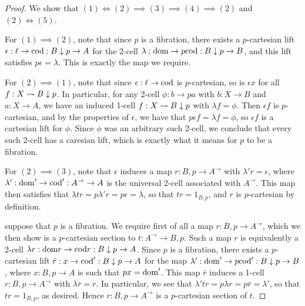 \documentclass[../thesis.tex]{subfiles}
\begin{document}
\begin{proof}
  We show that $(1) \iff (2) \implies (3) \implies (4) \implies (2)$ and $(2) \iff (5)$.

  For $(1) \implies (2)$, note that since $p$ is a fibration, there exists a $p$-cartesian lift $\epsilon : \ell
  \to {\mathrm{cod}} : B \mathrel{\downarrow} p \to A$ for the 2-cell $\lambda : {\mathrm{dom}} \to p{\mathrm{cod}} : B \mathrel{\downarrow} p \to B$, and this lift
  satisfies $p\epsilon = \lambda$. This is exactly the map we require.

  For $(2) \implies (1)$, note that since $\epsilon : \ell \to {\mathrm{cod}}$ is $p$-cartesian, so is $\epsilon x$ for
  all $f : X \rightsquigarrow B \mathrel{\downarrow} p$. In particular, for any 2-cell $\phi : b \to pa$ with $b : X \to B$ and $a : X
  \to A$, we have an induced 1-cell $f : X \rightsquigarrow B \mathrel{\downarrow} p$ with $\lambda f = \phi$. Then $\epsilon f$ is $p$-%
  cartesian, and by the properties of $\epsilon$, we have that $p\epsilon f = \lambda f = \phi$, so $\epsilon f$
  is a cartesian lift for $\phi$. Since $\phi$ was an arbitrary such 2-cell, we conclude that every such 2-cell
  has a caresian lift, which is exactly what it means for $p$ to be a fibration.


  For $(2) \implies (3)$, note that $\epsilon$ induces a map $r : B \comma p \to A^\to$ with $\lambda'r =
  \epsilon$, where $\lambda' : {\mathrm{dom}}' \to {\mathrm{cod}}' : A^\to \to A$ is the universal 2-cell associated with $A^\to$.
  This map then satisfies that $\lambda tr = p\lambda' r = p\epsilon = \lambda$, so that $tr = 1_{B \comma p}$,
  and $r$ is $p$-cartesian by definition.

  suppose that $p$ is a fibration. We require first of all a map $r : B \comma p \to
  A^\to$, which we then show is a $p$-cartesian section to $t : A^\to \to B \comma p$. Such a map $r$ is
  equivalently a 2-cell $\lambda r : {\mathrm{dom}} r \to {\mathrm{cod}} r : B \mathrel{\downarrow} p \to A$. Since $p$ is a fibration, there
  exists a $p$-cartesian lift $\bar r : x \to {\mathrm{cod}}' : B \mathrel{\downarrow} p \to A$ for the map $\lambda' : {\mathrm{dom}}' \to p
  {\mathrm{cod}}' : B \mathrel{\downarrow} p \to B$, where $x : B \comma p \to A$ is such that $px = {\mathrm{dom}}'$. This map $\bar r$ induces
  a 1-cell $r : B \comma p \to A^\to$ with $\lambda \bar r = r$. In particular, we see that $\lambda' t r =
  p\lambda r = p\bar r = \lambda'$, so that $tr = 1_{B \comma p}$, as desired. Hence $r : B \comma p \to A^\to$
  is a $p$-cartesian section of $t$.


\end{proof}
\end{document}
